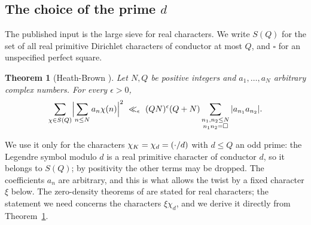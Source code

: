 \documentclass[10pt]{amsart}
\newtheorem{theorem}{Theorem}[section]
\theoremstyle{definition}
\theoremstyle{remark}
\begin{document}
\subsection{The choice of the prime \texorpdfstring{$d$}{d}}\label{an:ssec-choice}
The published input is the large sieve for real characters. We write
$S(Q)$ for the set of all real primitive Dirichlet characters of conductor at
most $Q$, and $\square$ for an unspecified perfect square.

\begin{theorem}[Heath-Brown {\cite[Corollary~2]{HeathBrown1995}}]\label{an:thm-HB}
Let $N,Q$ be positive integers and $a_1,\dots,a_N$ arbitrary complex numbers. For every
$\epsilon>0$,
\[
 \sum_{\chi\in S(Q)}\Bigl|\sum_{n\le N}a_n\chi(n)\Bigr|^2
 \ \ll_\epsilon\ (QN)^{\epsilon}(Q+N)\sum_{\substack{n_1,n_2\le N\\ n_1n_2=\square}}|a_{n_1}a_{n_2}| .
\]
\end{theorem}
We use it only for the characters $\chi_K=\chi_d=(\cdot/d)$ with $d\le Q$ an odd
prime: the Legendre symbol modulo $d$ is a real primitive character of
conductor $d$, so it belongs to $S(Q)$; by positivity the other
terms may be dropped. The coefficients $a_n$ are arbitrary, and this is
what allows the twist by a fixed character $\xi$ below. The zero-density
theorems of \cite{HeathBrown1995} are stated for real characters; the
statement we need concerns the characters $\xi\chi_d$, and we derive it
directly from Theorem~\ref{an:thm-HB}.
\end{document}
